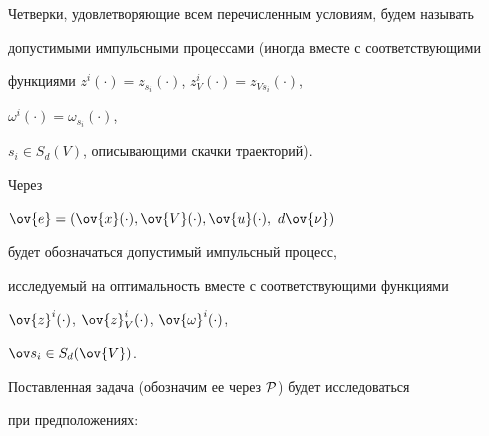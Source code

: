 Четверки, удовлетворяющие всем перечисленным условиям, будем называть


допустимыми импульсными процессами (иногда вместе с соответствующими


функциями $z^i(\cdot)=z_{s_i}(\cdot)$, $z_V^i(\cdot)=z_{Vs_i}(\cdot)$,


$\omega^i(\cdot)=\omega_{s_i}(\cdot)$,


$s_i\in S_d(V)$, описывающими скачки траекторий).


Через


$\ov{e}=(\ov{x}(\cdot), \ov{V}(\cdot), \ov{u}(\cdot),


\ d\ov{\nu})$


будет обозначаться допустимый импульсный процесс,


исследуемый на оптимальность вместе с соответствующими функциями


$\ov{z}^i(\cdot)$, $\ov{z}_{V}^i(\cdot)$, $\ov{\omega}^i(\cdot)$,


$\ov s_i \in S_d(\ov{V})$.





Поставленная задача (обозначим ее через $\cal P$) будет исследоваться


при предположениях:


